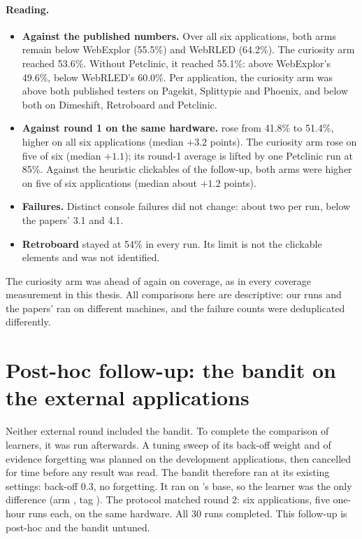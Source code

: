 \paragraph{Reading.}
\begin{itemize}
  \item \textbf{Against the published numbers.} Over all six applications, both arms remain
        below WebExplor (55.5\%) and WebRLED (64.2\%). The curiosity arm reached 53.6\%.
        Without Petclinic, it reached 55.1\%: above WebExplor's 49.6\%, below WebRLED's
        60.0\%. Per application, the curiosity arm was above both published testers on
        Pagekit, Splittypie and Phoenix, and below both on Dimeshift, Retroboard and
        Petclinic.
  \item \textbf{Against round 1 on the same hardware.}  rose from 41.8\%
        to 51.4\%, higher on all six applications (median $+3.2$ points). The curiosity arm
        rose on five of six (median $+1.1$); its round-1 average is lifted by one Petclinic
        run at 85\%. Against the heuristic clickables of the follow-up, both arms were
        higher on five of six applications (median about $+1.2$ points).
  \item \textbf{Failures.} Distinct console failures did not change: about two per run,
        below the papers' 3.1 and 4.1.
  \item \textbf{Retroboard} stayed at 54\% in every run. Its limit is not the clickable
        elements and was not identified.
\end{itemize}

The curiosity arm was ahead of  again on coverage, as in every
coverage measurement in this thesis. All comparisons here are descriptive: our runs and the
papers' ran on different machines, and the failure counts were deduplicated differently.

\section{Post-hoc follow-up: the bandit on the external applications}
\label{sec:bandit-ext}

Neither external round included the bandit. To complete the comparison of learners, it was
run afterwards. A tuning sweep of its back-off weight and of evidence forgetting was planned
on the development applications, then cancelled for time before any result was read. The
bandit therefore ran at its existing settings: back-off 0.3, no forgetting. It ran on
's base, so the learner was the only difference (arm
, tag ). The protocol matched round 2: six
applications, five one-hour runs each, on the same hardware. All 30 runs completed. This
follow-up is post-hoc and the bandit untuned.

